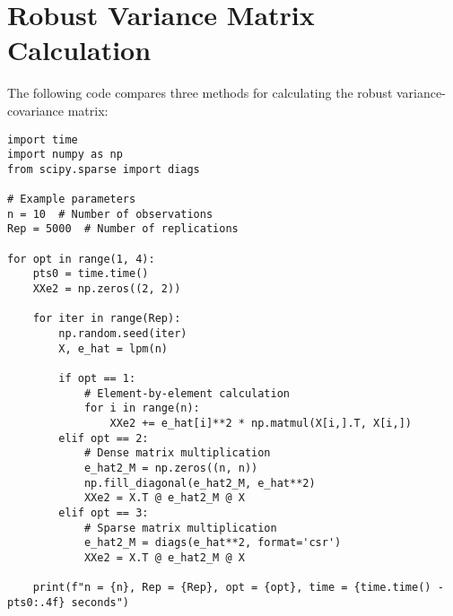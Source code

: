 \documentclass{article}
\begin{document}
\section{Robust Variance Matrix Calculation}

The following code compares three methods for calculating the robust variance-covariance matrix:

\begin{lstlisting}[caption={Robust Variance Matrix Calculation}, label={lst:variance_matrix}]
import time
import numpy as np
from scipy.sparse import diags

# Example parameters
n = 10  # Number of observations
Rep = 5000  # Number of replications

for opt in range(1, 4):
    pts0 = time.time()
    XXe2 = np.zeros((2, 2))
    
    for iter in range(Rep):
        np.random.seed(iter)
        X, e_hat = lpm(n)
        
        if opt == 1:
            # Element-by-element calculation
            for i in range(n):
                XXe2 += e_hat[i]**2 * np.matmul(X[i,].T, X[i,])
        elif opt == 2:
            # Dense matrix multiplication
            e_hat2_M = np.zeros((n, n))
            np.fill_diagonal(e_hat2_M, e_hat**2)
            XXe2 = X.T @ e_hat2_M @ X
        elif opt == 3:
            # Sparse matrix multiplication
            e_hat2_M = diags(e_hat**2, format='csr')
            XXe2 = X.T @ e_hat2_M @ X
    
    print(f"n = {n}, Rep = {Rep}, opt = {opt}, time = {time.time() - pts0:.4f} seconds")
\end{lstlisting}
\end{document}
